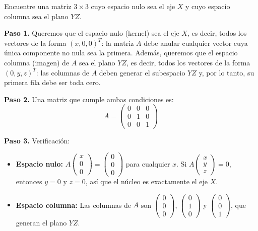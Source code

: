 \begin{prob}
Encuentre una matriz $3\times 3$ cuyo espacio nulo sea el eje $X$ y cuyo espacio columna sea el plano $YZ$.
\begin{myproof}
\textbf{Paso 1.} Queremos que el espacio nulo (kernel) sea el eje $X$, es decir, todos los vectores de la forma $(x,0,0)^T$: la matriz $A$ debe anular cualquier vector cuya única componente no nula sea la primera. Además, queremos que el espacio columna (imagen) de $A$ sea el plano $YZ$, es decir, todos los vectores de la forma $(0, y, z)^T$: las columnas de $A$ deben generar el subespacio $YZ$ y, por lo tanto, su primera fila debe ser toda cero.

\textbf{Paso 2.} Una matriz que cumple ambas condiciones es:
\[
\boxed{A = \begin{pmatrix}
0 & 0 & 0 \\
0 & 1 & 0 \\
0 & 0 & 1
\end{pmatrix}}
\]

\textbf{Paso 3.} Verificación:
\begin{itemize}
    \item \textbf{Espacio nulo:} $A\begin{pmatrix} x \\ 0 \\ 0 \end{pmatrix} = \begin{pmatrix} 0 \\ 0 \\ 0 \end{pmatrix}$ para cualquier $x$. Si $A\begin{pmatrix} x \\ y \\ z \end{pmatrix} = 0$, entonces $y = 0$ y $z = 0$, así que el núcleo es exactamente el eje $X$.
    \item \textbf{Espacio columna:} Las columnas de $A$ son $\begin{pmatrix} 0 \\ 0 \\ 0 \end{pmatrix}$, $\begin{pmatrix} 0 \\ 1 \\ 0 \end{pmatrix}$ y $\begin{pmatrix} 0 \\ 0 \\ 1 \end{pmatrix}$, que generan el plano $YZ$.
\end{itemize}
\end{myproof}
\end{prob}

